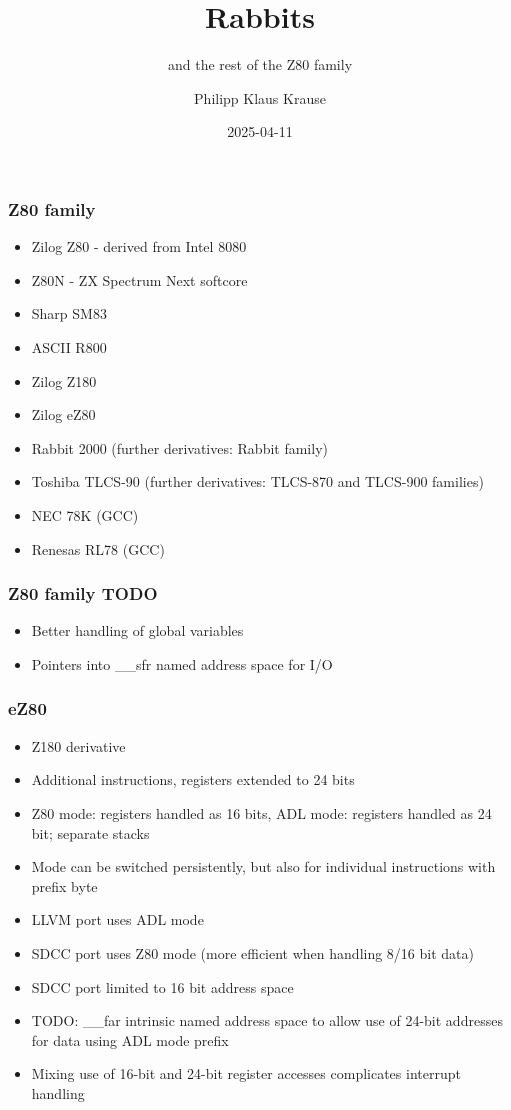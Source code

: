 \documentclass[xcolor=dvipsnames]{beamer}
\title{Rabbits}
\subtitle{and the rest of the Z80 family}
\date{2025-04-11}
\author{Philipp Klaus Krause}
\begin{document}
\begin{frame}
	\titlepage
\end{frame}

\begin{frame}
	\frametitle{Z80 family}
	\begin{itemize}
		\item Zilog Z80 - derived from Intel 8080
		\item Z80N - ZX Spectrum Next softcore
		\item Sharp SM83
		\item ASCII R800
		\item Zilog Z180
		\item Zilog eZ80
		\item Rabbit 2000 (further derivatives: Rabbit family)
		\item Toshiba TLCS-90 (further derivatives: TLCS-870 and TLCS-900 families)
		\item NEC 78K (GCC)
		\item Renesas RL78 (GCC)
	\end{itemize}
\end{frame}

\begin{frame}
	\frametitle{Z80 family TODO}
	\begin{itemize}
		\item Better handling of global variables
		\item Pointers into \_\_sfr named address space for I/O
	\end{itemize}
\end{frame}

\begin{frame}
	\frametitle{eZ80}
	\begin{itemize}
		\item Z180 derivative
		\item Additional instructions, registers extended to 24 bits
		\item Z80 mode: registers handled as 16 bits, ADL mode: registers handled as 24 bit; separate stacks
		\item Mode can be switched persistently, but also for individual instructions with prefix byte
		\item LLVM port uses ADL mode
		\item SDCC port uses Z80 mode (more efficient when handling 8/16 bit data)
		\item SDCC port limited to 16 bit address space
		\item TODO: \_\_far intrinsic named address space to allow use of 24-bit addresses for data using ADL mode prefix
		\item Mixing use of 16-bit and 24-bit register accesses complicates interrupt handling
	\end{itemize}
\end{frame}
\end{document}
